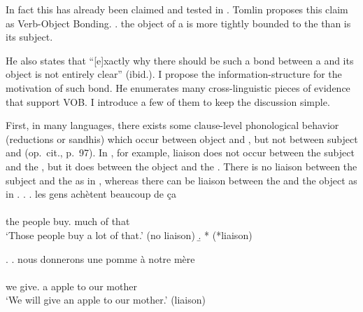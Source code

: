 In fact this has already been claimed and tested in .
Tomlin proposes this claim as Verb-Object Bonding.
%
\ex. 
	the object of a  is more tightly bounded to the 
	than is its subject.
	\hfill{\cite[][74]{tomlin86}}

He also states that
``[e]xactly why there should be such a bond between a  and its object is not entirely clear'' (ibid.).
I propose the information-structure 
for the motivation of such bond.
He enumerates many cross-linguistic pieces of evidence that support VOB.
I introduce a few of them to keep the discussion simple.

First,
in many languages,
there exists some clause-level phonological behavior
(reductions or sandhis) which occur between object and ,
but not between subject and  (op.~cit., p.~97).
In , for example,
liaison does not occur between the subject and the ,
but it does between the object and the  \cite[see also][]{selkirk72}.
There is no liaison between the subject  and the   as in \Next,
whereas there can be liaison between the   and the object  as in \NNext.%
%
\ex.
 \a. \glll
	les gens ach\`{e}tent beaucoup de \c{c}a \\
	      \\
	the people buy. much of that \\
	`Those people buy a lot of that.' \hfill{(no liaison)}
 \b. *      
 		 \hfill{(*liaison)}

\ex.
 \a. \glll
	nous donnerons une pomme \`a notre m\`ere \\
  	       \\
	we give. a apple to our mother \\
	`We will give an apple to our mother.'
	\hfill{(liaison)}
\begin{flushright}
\cite[][pp.~98-99, transcription modified based on standard ]{tomlin86}
\end{flushright}

